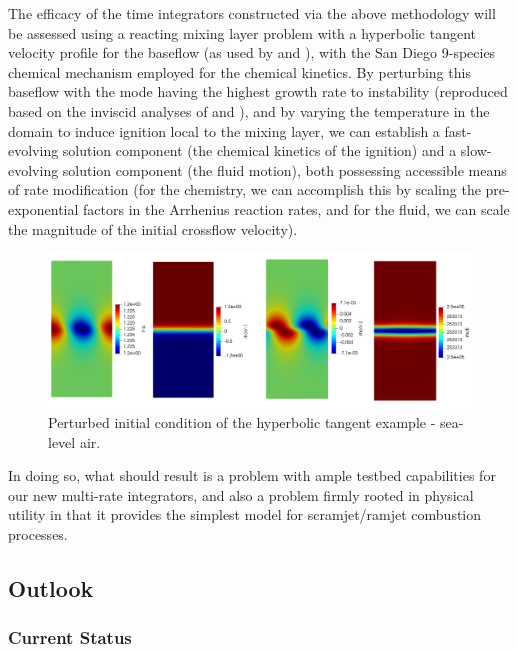 The efficacy of the time integrators constructed via the above methodology will
be assessed using a reacting mixing layer problem with a hyperbolic tangent velocity profile
for the baseflow (as used by \cite{michalke1964inviscid} and \cite{blumen1970shear}), with
the San Diego 9-species chemical mechanism \cite{sandiego} employed for the chemical kinetics. By perturbing
this baseflow with the mode having the highest growth rate to instability (reproduced based
on the inviscid analyses of \cite{michalke1964inviscid} and \cite{blumen1970shear}), and by
varying the temperature in the domain to induce ignition local to the mixing layer, we can
establish a fast-evolving solution component (the chemical kinetics of the ignition) and a
slow-evolving solution component (the fluid motion), both possessing accessible
means of rate modification (for the chemistry, we can accomplish this by scaling the
pre-exponential factors in the Arrhenius reaction rates, and for the fluid, we can scale
the magnitude of the initial crossflow velocity).
\begin{figure}
\centering
\includegraphics[width=0.9\linewidth,trim=4 4 4 4,clip]{figures/hyperbolic_tangent_air.png}
\caption{Perturbed initial condition of the hyperbolic tangent example - sea-level air.}
\label{fig:hyperbolic_cold_rhov2}
\end{figure}
In doing so, what should result is a problem with ample testbed capabilities for our
new multi-rate integrators, and also a problem firmly rooted in physical utility in that
it provides the simplest model for scramjet/ramjet combustion processes.

\subsection{Outlook}

\subsubsection{Current Status}

